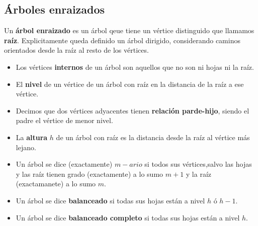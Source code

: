 \subsection{Árboles enraizados}
Un \textbf{árbol enraizado} es un árbol qeue tiene un vértice distinguido que llamamos \textbf{raíz}. Explicitamente queda definido un árbol dirigido, considerando caminos orientados desde la raíz al resto de los vértices. 

\begin{itemize}
	\item Los vértices \textbf{internos} de un árbol son aquellos que no son ni hojas ni la raíz.
	\item El \textbf{nivel} de un vértice de un árbol con raíz en la distancia de la raíz a ese vértice.
	\item Decimos que dos vértices adyacentes tienen \textbf{relación parde-hijo}, siendo el padre el vértice de menor nivel.
	\item La \textbf{altura} \(h\) de un árbol con raíz es la distancia desde la raíz al vértice más lejano.
	\item Un árbol se dice (exactamente) \(m-ario\) si todos sus vértices,salvo las hojas y las raíz tienen grado (exactamente) a lo sumo \(m + 1\) y la raíz (exactamanete) a lo sumo \(m\).
	\item Un árbol se dice \textbf{balanceado} si todas sus hojas están a nivel \(h\) ó \(h - 1\).
	\item Un árbol se dice \textbf{balanceado completo} si todas sus hojas están a nivel \(h\).
\end{itemize}

